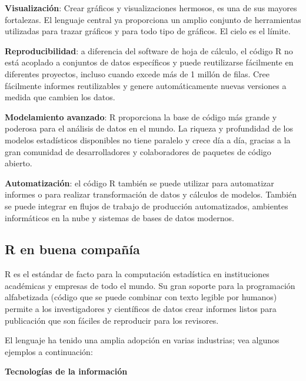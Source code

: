 \documentclass[
]{book}
\begin{document}
\textbf{Visualización}: Crear gráficos y visualizaciones hermosos, es una de sus mayores fortalezas. El lenguaje central ya proporciona un amplio conjunto de herramientas utilizadas para trazar gráficos y para todo tipo de gráficos. El cielo es el límite.

\textbf{Reproducibilidad}: a diferencia del software de hoja de cálculo, el código R no está acoplado a conjuntos de datos específicos y puede reutilizarse fácilmente en diferentes proyectos, incluso cuando excede más de 1 millón de filas. Cree fácilmente informes reutilizables y genere automáticamente nuevas versiones a medida que cambien los datos.

\textbf{Modelamiento avanzado}: R proporciona la base de código más grande y poderosa para el análisis de datos en el mundo. La riqueza y profundidad de los modelos estadísticos disponibles no tiene paralelo y crece día a día, gracias a la gran comunidad de desarrolladores y colaboradores de paquetes de código abierto.

\textbf{Automatización}: el código R también se puede utilizar para automatizar informes o para realizar transformación de datos y cálculos de modelos. También se puede integrar en flujos de trabajo de producción automatizados, ambientes informáticos en la nube y sistemas de bases de datos modernos.

\hypertarget{r-en-buena-compauxf1uxeda}{%
\subsection{R en buena compañía}\label{r-en-buena-compauxf1uxeda}}

R es el estándar de facto para la computación estadística en instituciones académicas y empresas de todo el mundo. Su gran soporte para la programación alfabetizada (código que se puede combinar con texto legible por humanos) permite a los investigadores y científicos de datos crear informes listos para publicación que son fáciles de reproducir para los revisores.

El lenguaje ha tenido una amplia adopción en varias industrias; vea algunos ejemplos a continuación:

\textbf{Tecnologías de la información}
\end{document}
